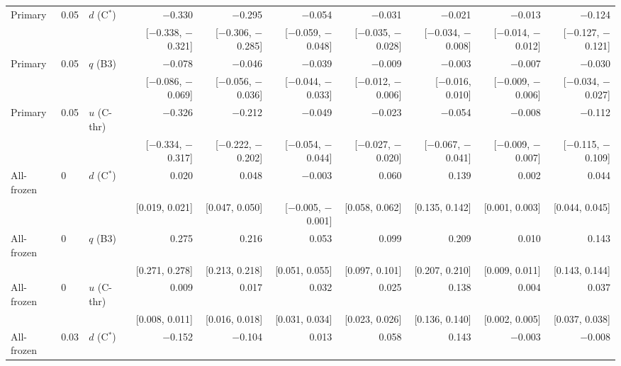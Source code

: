 \begin{tabular}{lllrrrrrrr}
Primary & 0.05 & $d$ (C$^*$) & $-$0.330 & $-$0.295 & $-$0.054 & $-$0.031 & $-$0.021 & $-$0.013 & $-$0.124 \\
 &  &  & {\scriptsize [$-$0.338, $-$0.321]} & {\scriptsize [$-$0.306, $-$0.285]} & {\scriptsize [$-$0.059, $-$0.048]} & {\scriptsize [$-$0.035, $-$0.028]} & {\scriptsize [$-$0.034, $-$0.008]} & {\scriptsize [$-$0.014, $-$0.012]} & {\scriptsize [$-$0.127, $-$0.121]} \\
Primary & 0.05 & $q$ (B3) & $-$0.078 & $-$0.046 & $-$0.039 & $-$0.009 & $-$0.003 & $-$0.007 & $-$0.030 \\
 &  &  & {\scriptsize [$-$0.086, $-$0.069]} & {\scriptsize [$-$0.056, $-$0.036]} & {\scriptsize [$-$0.044, $-$0.033]} & {\scriptsize [$-$0.012, $-$0.006]} & {\scriptsize [$-$0.016, 0.010]} & {\scriptsize [$-$0.009, $-$0.006]} & {\scriptsize [$-$0.034, $-$0.027]} \\
Primary & 0.05 & $u$ (C-thr) & $-$0.326 & $-$0.212 & $-$0.049 & $-$0.023 & $-$0.054 & $-$0.008 & $-$0.112 \\
 &  &  & {\scriptsize [$-$0.334, $-$0.317]} & {\scriptsize [$-$0.222, $-$0.202]} & {\scriptsize [$-$0.054, $-$0.044]} & {\scriptsize [$-$0.027, $-$0.020]} & {\scriptsize [$-$0.067, $-$0.041]} & {\scriptsize [$-$0.009, $-$0.007]} & {\scriptsize [$-$0.115, $-$0.109]} \\
All-frozen & 0 & $d$ (C$^*$) & 0.020 & 0.048 & $-$0.003 & 0.060 & 0.139 & 0.002 & 0.044 \\
 &  &  & {\scriptsize [0.019, 0.021]} & {\scriptsize [0.047, 0.050]} & {\scriptsize [$-$0.005, $-$0.001]} & {\scriptsize [0.058, 0.062]} & {\scriptsize [0.135, 0.142]} & {\scriptsize [0.001, 0.003]} & {\scriptsize [0.044, 0.045]} \\
All-frozen & 0 & $q$ (B3) & 0.275 & 0.216 & 0.053 & 0.099 & 0.209 & 0.010 & 0.143 \\
 &  &  & {\scriptsize [0.271, 0.278]} & {\scriptsize [0.213, 0.218]} & {\scriptsize [0.051, 0.055]} & {\scriptsize [0.097, 0.101]} & {\scriptsize [0.207, 0.210]} & {\scriptsize [0.009, 0.011]} & {\scriptsize [0.143, 0.144]} \\
All-frozen & 0 & $u$ (C-thr) & 0.009 & 0.017 & 0.032 & 0.025 & 0.138 & 0.004 & 0.037 \\
 &  &  & {\scriptsize [0.008, 0.011]} & {\scriptsize [0.016, 0.018]} & {\scriptsize [0.031, 0.034]} & {\scriptsize [0.023, 0.026]} & {\scriptsize [0.136, 0.140]} & {\scriptsize [0.002, 0.005]} & {\scriptsize [0.037, 0.038]} \\
All-frozen & 0.03 & $d$ (C$^*$) & $-$0.152 & $-$0.104 & 0.013 & 0.058 & 0.143 & $-$0.003 & $-$0.008 \\

\end{tabular}
